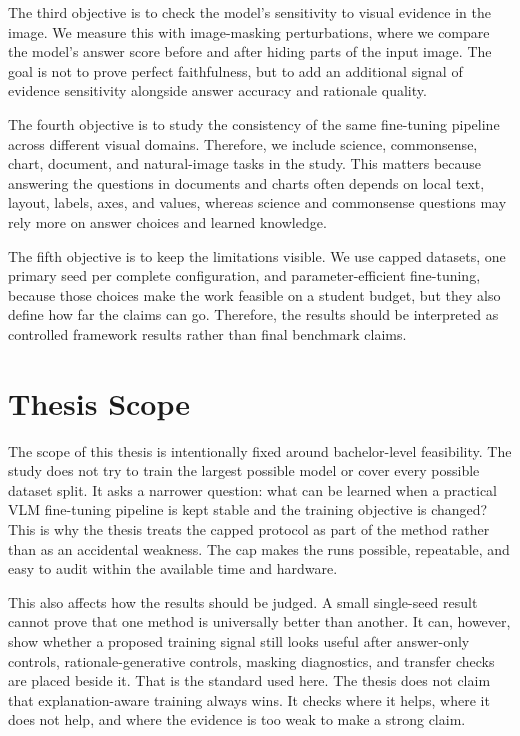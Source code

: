 \documentclass[12pt,bibliography=totoc,listof=totoc,BCOR=5mm,DIV=12,oneside,open=any]{scrbook}
\begin{document}
The third objective is to check the model's sensitivity to visual evidence in the image.
We measure this with image-masking perturbations, where we compare the model's answer score before and after hiding parts of the input image.
The goal is not to prove perfect faithfulness, but to add an additional signal of evidence sensitivity alongside answer accuracy and rationale quality.

The fourth objective is to study the consistency of the same fine-tuning pipeline across different visual domains.
Therefore, we include science, commonsense, chart, document, and natural-image tasks in the study.
This matters because answering the questions in documents and charts often depends on local text, layout, labels, axes, and values,
whereas science and commonsense questions may rely more on answer choices and learned knowledge.

The fifth objective is to keep the limitations visible.
We use capped datasets, one primary seed per complete configuration, and parameter-efficient fine-tuning,
because those choices make the work feasible on a student budget, but they also define how far the claims can go.
Therefore, the results should be interpreted as controlled framework results rather than final benchmark claims.

\section{Thesis Scope}
The scope of this thesis is intentionally fixed around bachelor-level feasibility.
The study does not try to train the largest possible model or cover every possible dataset split.
It asks a narrower question: what can be learned when a practical VLM fine-tuning pipeline is kept stable and the training objective is changed?
This is why the thesis treats the capped protocol as part of the method rather than as an accidental weakness.
The cap makes the runs possible, repeatable, and easy to audit within the available time and hardware.

This also affects how the results should be judged.
A small single-seed result cannot prove that one method is universally better than another.
It can, however, show whether a proposed training signal still looks useful after answer-only controls, rationale-generative controls, masking diagnostics, and transfer checks are placed beside it.
That is the standard used here.
The thesis does not claim that explanation-aware training always wins.
It checks where it helps, where it does not help, and where the evidence is too weak to make a strong claim.
\end{document}
